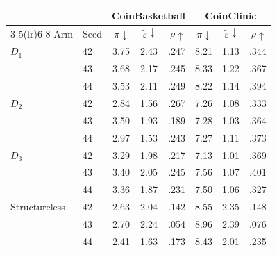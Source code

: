 \begin{tabular}{llrrr rrr}
\toprule
& & \multicolumn{3}{c}{CoinBasketball} & \multicolumn{3}{c}{CoinClinic} \\
\cmidrule(lr){3-5}\cmidrule(lr){6-8}
Arm & Seed & $\pi\downarrow$ & $\tilde\varepsilon\downarrow$ & $\rho\uparrow$
           & $\pi\downarrow$ & $\tilde\varepsilon\downarrow$ & $\rho\uparrow$ \\
\midrule
$D_1$ & 42 & 3.75 & 2.43 & .247 & 8.21 & 1.13 & .344 \\
      & 43 & 3.68 & 2.17 & .245 & 8.33 & 1.22 & .367 \\
      & 44 & 3.53 & 2.11 & .249 & 8.22 & 1.14 & .394 \\
\addlinespace
$D_2$ & 42 & 2.84 & 1.56 & .267 & 7.26 & 1.08 & .333 \\
      & 43 & 3.50 & 1.93 & .189 & 7.28 & 1.03 & .364 \\
      & 44 & 2.97 & 1.53 & .243 & 7.27 & 1.11 & .373 \\
\addlinespace
$D_3$ & 42 & 3.29 & 1.98 & .217 & 7.13 & 1.01 & .369 \\
      & 43 & 3.40 & 2.05 & .245 & 7.56 & 1.07 & .401 \\
      & 44 & 3.36 & 1.87 & .231 & 7.50 & 1.06 & .327 \\
\addlinespace
Structureless & 42 & 2.63 & 2.04 & .142 & 8.55 & 2.35 & .148 \\
              & 43 & 2.70 & 2.24 & .054 & 8.96 & 2.39 & .076 \\
              & 44 & 2.41 & 1.63 & .173 & 8.43 & 2.01 & .235 \\
\bottomrule
\end{tabular}
